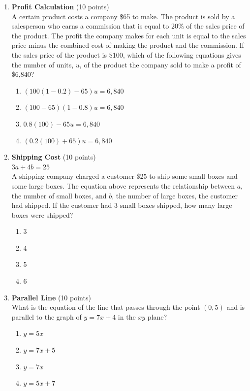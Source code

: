\begin{enumerate}
  \item \textbf{Profit Calculation} (10 points)\\
  A certain product costs a company \$65 to make. The product is sold by a salesperson who earns a commission that is equal to 20\% of the sales price of the product. The profit the company makes for each unit is equal to the sales price minus the combined cost of making the product and the commission. If the sales price of the product is \$100, which of the following equations gives the number of units, $u$, of the product the company sold to make a profit of \$6,840?\\
  \begin{enumerate}[label=(\Alph*)]
    \item $(100(1-0.2)-65)u=6,840$
    \item $(100-65)(1-0.8)u=6,840$
    \item $0.8(100)-65u=6,840$
    \item $(0.2(100)+65)u=6,840$
  \end{enumerate}
  \begin{subanswer}
  \end{subanswer}

  \item \textbf{Shipping Cost} (10 points)\\
  $3a+4b=25$\\
  A shipping company charged a customer \$25 to ship some small boxes and some large boxes. The equation above represents the relationship between $a$, the number of small boxes, and $b$, the number of large boxes, the customer had shipped. If the customer had 3 small boxes shipped, how many large boxes were shipped?\\
  \begin{enumerate}[label=(\Alph*)]
    \item 3
    \item 4
    \item 5
    \item 6
  \end{enumerate}
  \begin{subanswer}
  \end{subanswer}

  \item \textbf{Parallel Line} (10 points)\\
  What is the equation of the line that passes through the point $(0,5)$ and is parallel to the graph of $y=7x+4$ in the $xy$ plane?\\
  \begin{enumerate}[label=(\Alph*)]
    \item $y=5x$
    \item $y=7x+5$
    \item $y=7x$
    \item $y=5x+7$
  \end{enumerate}
  \begin{subanswer}
  \end{subanswer}


\end{enumerate}
